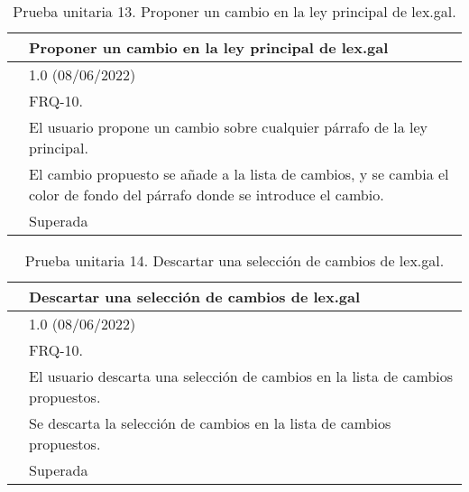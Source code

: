 \begin{table}[H]
\begin{center}
\begin{tabular}{|p{3cm}|p{10cm}|} \hline
\centering {\bf PU-13} & Proponer un cambio en la ley principal de lex.gal  \\ \hline\hline
\centering {\bf Versión} & 1.0 (08/06/2022) \\ \hline
\centering {\bf Dependencias} & FRQ-10. \\ \hline
\centering {\bf Descripción} &  El usuario propone un cambio sobre cualquier párrafo de la ley principal. \\ \hline
\centering {\bf Criterio de aceptación} & El cambio propuesto se añade a la lista de cambios, y se cambia el color de fondo del párrafo donde se introduce el cambio. \\ \hline
\centering {\bf Estado} & Superada \\ \hline
\end{tabular}
\caption{Prueba unitaria 13. Proponer un cambio en la ley principal de lex.gal.}
\label{enlacePU13}
\end{center}
\end{table}

\begin{table}[H]
\begin{center}
\begin{tabular}{|p{3cm}|p{10cm}|} \hline
\centering {\bf PU-14} & Descartar una selección de cambios de lex.gal  \\ \hline\hline
\centering {\bf Versión} & 1.0 (08/06/2022) \\ \hline
\centering {\bf Dependencias} & FRQ-10. \\ \hline
\centering {\bf Descripción} &  El usuario descarta una selección de cambios en la lista de cambios propuestos. \\ \hline
\centering {\bf Criterio de aceptación} & Se descarta la selección de cambios en la lista de cambios propuestos. \\ \hline
\centering {\bf Estado} & Superada \\ \hline
\end{tabular}
\caption{Prueba unitaria 14. Descartar una selección de cambios de lex.gal.}
\label{enlacePU14}
\end{center}
\end{table}

